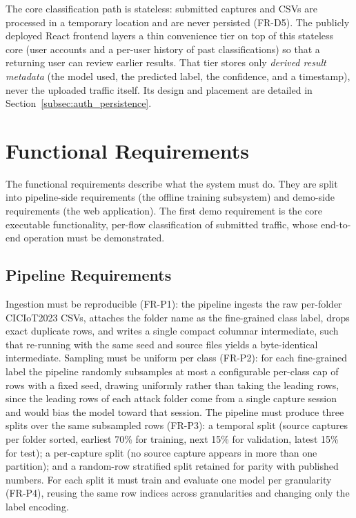 \par The core classification path is stateless: submitted captures and CSVs are processed in a temporary location and are never persisted (FR-D5). The publicly deployed React frontend layers a thin convenience tier on top of this stateless core (user accounts and a per-user history of past classifications) so that a returning user can review earlier results. That tier stores only \emph{derived result metadata} (the model used, the predicted label, the confidence, and a timestamp), never the uploaded traffic itself. Its design and placement are detailed in Section~\ref{subsec:auth_persistence}.

\section{Functional Requirements}
\label{sec:functional_requirements}

\par The functional requirements describe what the system must do. They are split into pipeline-side requirements (the offline training subsystem) and demo-side requirements (the web application). The first demo requirement is the core executable functionality, per-flow classification of submitted traffic, whose end-to-end operation must be demonstrated.

\subsection{Pipeline Requirements}
\label{subsec:pipeline_requirements}

\par Ingestion must be reproducible (FR-P1): the pipeline ingests the raw per-folder CICIoT2023 CSVs, attaches the folder name as the fine-grained class label, drops exact duplicate rows, and writes a single compact columnar intermediate, such that re-running with the same seed and source files yields a byte-identical intermediate. Sampling must be uniform per class (FR-P2): for each fine-grained label the pipeline randomly subsamples at most a configurable per-class cap of rows with a fixed seed, drawing uniformly rather than taking the leading rows, since the leading rows of each attack folder come from a single capture session and would bias the model toward that session. The pipeline must produce three splits over the same subsampled rows (FR-P3): a temporal split (source captures per folder sorted, earliest 70\% for training, next 15\% for validation, latest 15\% for test); a per-capture split (no source capture appears in more than one partition); and a random-row stratified split retained for parity with published numbers. For each split it must train and evaluate one model per granularity (FR-P4), reusing the same row indices across granularities and changing only the label encoding.


